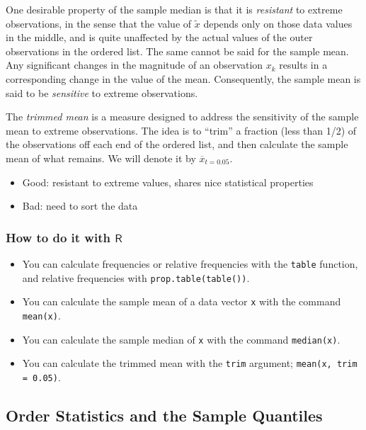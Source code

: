 \documentclass[captions=tableheading]{scrbook}
\begin{document}
One desirable property of the sample median is that it is \emph{resistant} to extreme observations, in the sense that the value of \(\tilde{x}\) depends only on those data values in the middle, and is quite unaffected by the actual values of the outer observations in the ordered list. The same cannot be said for the sample mean. Any significant changes in the magnitude of an observation \(x_{k}\) results in a corresponding change in the value of the mean. Consequently, the sample mean is said to be \emph{sensitive} to extreme observations.

The \emph{trimmed mean} is a measure designed to address the sensitivity of the sample mean to extreme observations. The idea is to ``trim'' a fraction (less than 1/2) of the observations off each end of the ordered list, and then calculate the sample mean of what remains. We will denote it by \(\overline{x}_{t=0.05}\).

\begin{itemize}
\item Good: resistant to extreme values, shares nice statistical properties
\item Bad: need to sort the data
\end{itemize}
\subsubsection{How to do it with \(\mathsf{R}\)}
\label{sec-2-3-2-1}


\begin{itemize}
\item You can calculate frequencies or relative frequencies with the \texttt{table} function, and relative frequencies with \texttt{prop.table(table())}.
\item You can calculate the sample mean of a data vector \texttt{x} with the command \texttt{mean(x)}.
\item You can calculate the sample median of \texttt{x} with the command \texttt{median(x)}.
\item You can calculate the trimmed mean with the \texttt{trim} argument; \texttt{mean(x, trim = 0.05)}.
\end{itemize}
\subsection{Order Statistics and the Sample Quantiles}
\label{sec-2-3-3}
\label{sub:Order-Statistics-and}
\end{document}

